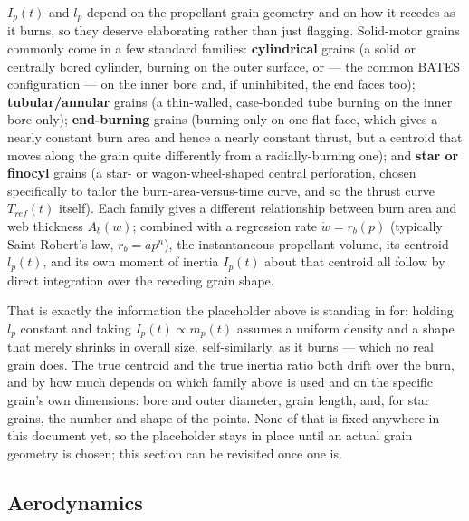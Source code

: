 $I_p(t)$ and $l_p$ depend on the propellant grain geometry and on how it recedes as it burns, so
they deserve elaborating rather than just flagging. Solid-motor grains commonly come in a few
standard families: \textbf{cylindrical} grains (a solid or centrally bored cylinder, burning on
the outer surface, or --- the common BATES configuration --- on the inner bore and, if
uninhibited, the end faces too); \textbf{tubular/annular} grains (a thin-walled, case-bonded tube
burning on the inner bore only); \textbf{end-burning} grains (burning only on one flat face, which
gives a nearly constant burn area and hence a nearly constant thrust, but a centroid that moves
along the grain quite differently from a radially-burning one); and \textbf{star or finocyl}
grains (a star- or wagon-wheel-shaped central perforation, chosen specifically to tailor the
burn-area-versus-time curve, and so the thrust curve $T_{ref}(t)$ itself). Each family gives a
different relationship between burn area and web thickness $A_b(w)$; combined with a regression
rate $\dot{w}=r_b(p)$ (typically Saint-Robert's law, $r_b=ap^n$), the instantaneous propellant
volume, its centroid $l_p(t)$, and its own moment of inertia $I_p(t)$ about that centroid all
follow by direct integration over the receding grain shape.

That is exactly the information the placeholder above is standing in for: holding $l_p$ constant
and taking $I_p(t)\propto m_p(t)$ assumes a uniform density and a shape that merely shrinks in
overall size, self-similarly, as it burns --- which no real grain does. The true centroid and the
true inertia ratio both drift over the burn, and by how much depends on which family above is
used and on the specific grain's own dimensions: bore and outer diameter, grain length, and, for
star grains, the number and shape of the points. None of that is fixed anywhere in this document
yet, so the placeholder stays in place until an actual grain geometry is chosen; this section can
be revisited once one is.

\subsection{Aerodynamics}\label{sec:aero}
